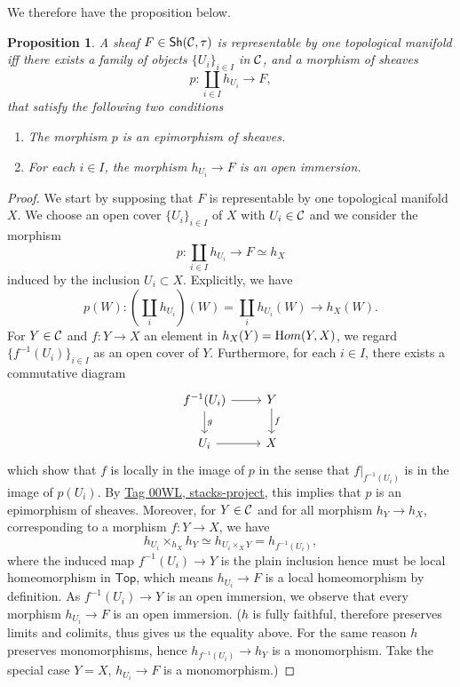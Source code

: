 \documentclass{tufte-book} %
\numberwithin{dummy}{section}
\newtheorem{prop}[thm]{Proposition}
\renewcommand{\hom}{{\textnormal Hom}}
\newcommand{\calc}{{\cal C}}
\newcommand{\lrta}{\longrightarrow}
\begin{document}
We therefore have the proposition below.
\begin{prop}\label{lem:criterion_representable_TopMfd}
A sheaf $F\in \mathsf{Sh}(\calc,\tau)$ is representable by one topological manifold iff there exists a family of objects $\{U_i\}_{i\in I}$ in $\calc$, and a morphism of sheaves
$$
p:\coprod_{i\in I}h_{U_i}\lrta F,
$$ 
that satisfy the following two conditions
\begin{enumerate}
\item The morphism $p$ is an epimorphism of sheaves.
\item For each $i\in I$, the morphism $h_{U_i}\lrta F$ is an open immersion.
\end{enumerate}
\end{prop} 
\begin{proof}
We start by supposing that $F$ is representable by one topological manifold $X$. We choose an open cover $\{U_i\}_{i\in I}$ of $X$ with $U_i\in \calc$ and we consider the morphism
$$
p:\coprod_{i\in I}h_{U_i}\lrta F\simeq h_X
$$
induced by the inclusion $U_i\subset X$. Explicitly, we have
$$
p(W):\left(\coprod_{i}h_{U_i}\right)(W)=\coprod_i h_{U_i}(W)\lrta h_X(W).
$$ 
For $Y\in \calc$ and $f:Y\lrta X$ an element in $h_X(Y)=\hom(Y,X)$, we regard $\{f^{-1}(U_i)\}_{i\in I}$ as an open cover of $Y$. Furthermore, for each $i\in I$, there exists a commutative diagram
$$
\begin{tikzcd}
f^{-1}(U_i) \arrow[d,"g"] \arrow[r] & Y \arrow[d,"f"] \\
U_i \arrow[r] & X
\end{tikzcd}
$$
which show that $f$ is locally in the image of $p$ in the sense that $f|_{f^{-1}(U_i)}$ is in the image of $p(U_i)$. By \href{http://stacks.math.columbia.edu/tag/00WL}{Tag 00WL, stacks-project},  this implies that $p$ is an epimorphism of sheaves. Moreover, for $Y\in \calc$ and for all morphism $h_Y\lrta h_X$, corresponding to a morphism $f:Y\lrta X$, we have
$$
h_{U_i}\times_{h_{X}}h_Y\simeq h_{U_i\times_X Y}=h_{f^{-1}(U_i)},
$$
where the induced map $f^{-1}(U_i)\lrta Y$ is the plain inclusion hence must be local homeomorphism in $\mathsf{Top}$,
which means $h_{U_i}\lrta F$ is a local homeomorphism by definition.
As $f^{-1}(U_i)\lrta Y$ is an open immersion, we observe that every morphism $h_{U_i}\lrta F$ is an open immersion. ($h$ is fully faithful, therefore preserves limits and colimits, thus gives us the equality above. For the same reason $h$ preserves monomorphisms, hence $h_{f^{-1}(U_i)}\lrta h_Y$ is a monomorphism. Take the special case $Y=X$, $h_{U_i}\lrta F$ is a monomorphism.)


\end{proof}
\end{document}
